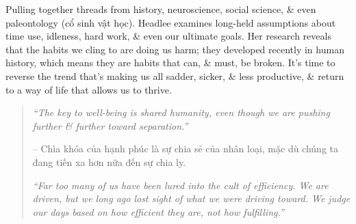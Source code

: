 \documentclass{article}
\begin{document}
\begin{enumerate}
	Pulling together threads from history, neuroscience, social science, \& even paleontology (cổ sinh vật học). {\sc Headlee} examines long-held assumptions about time use, idleness, hard work, \& even our ultimate goals. Her research reveals that the habits we cling to are doing us harm; they developed recently in human history, which means they are habits that can, \& must, be broken. It's time to reverse the trend that's making us all sadder, sicker, \& less productive, \& return to a way of life that allows us to thrive.
	\begin{quotation}
		{\it``The key to well-being is shared humanity, even though we are pushing further \& further toward separation.''}

		-- Chìa khóa của hạnh phúc là sự chia sẻ của nhân loại, mặc dù chúng ta đang tiến xa hơn nữa đến sự chia ly.

		{\it``Far too many of us have been lured into the cult of efficiency. We are driven, but we long ago lost sight of what we were driving toward. We judge our days based on how efficient they are, not how fulfilling.''}


\end{quotation}
\end{enumerate}
\end{document}
